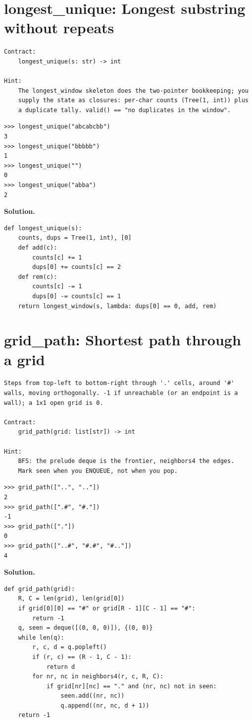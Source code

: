 \documentclass[10pt,letterpaper]{book}
\begin{document}
\section{longest\_unique: Longest substring without repeats}
\begin{lstlisting}[style=ex]
Contract:
    longest_unique(s: str) -> int

Hint:
    The longest_window skeleton does the two-pointer bookkeeping; you
    supply the state as closures: per-char counts (Tree(1, int)) plus
    a duplicate tally. valid() == "no duplicates in the window".
\end{lstlisting}
\begin{lstlisting}[style=ex]
>>> longest_unique("abcabcbb")
3
>>> longest_unique("bbbbb")
1
>>> longest_unique("")
0
>>> longest_unique("abba")
2
\end{lstlisting}
\noindent\textbf{Solution.}
\begin{lstlisting}[style=code]
def longest_unique(s):
    counts, dups = Tree(1, int), [0]
    def add(c):
        counts[c] += 1
        dups[0] += counts[c] == 2
    def rem(c):
        counts[c] -= 1
        dups[0] -= counts[c] == 1
    return longest_window(s, lambda: dups[0] == 0, add, rem)
\end{lstlisting}

\section{grid\_path: Shortest path through a grid}
\begin{lstlisting}[style=ex]
Steps from top-left to bottom-right through '.' cells, around '#'
walls, moving orthogonally. -1 if unreachable (or an endpoint is a
wall); a 1x1 open grid is 0.

Contract:
    grid_path(grid: list[str]) -> int

Hint:
    BFS: the prelude deque is the frontier, neighbors4 the edges.
    Mark seen when you ENQUEUE, not when you pop.
\end{lstlisting}
\begin{lstlisting}[style=ex]
>>> grid_path(["..", ".."])
2
>>> grid_path([".#", "#."])
-1
>>> grid_path(["."])
0
>>> grid_path(["..#", "#.#", "#.."])
4
\end{lstlisting}
\noindent\textbf{Solution.}
\begin{lstlisting}[style=code]
def grid_path(grid):
    R, C = len(grid), len(grid[0])
    if grid[0][0] == "#" or grid[R - 1][C - 1] == "#":
        return -1
    q, seen = deque([(0, 0, 0)]), {(0, 0)}
    while len(q):
        r, c, d = q.popleft()
        if (r, c) == (R - 1, C - 1):
            return d
        for nr, nc in neighbors4(r, c, R, C):
            if grid[nr][nc] == "." and (nr, nc) not in seen:
                seen.add((nr, nc))
                q.append((nr, nc, d + 1))
    return -1
\end{lstlisting}
\end{document}
